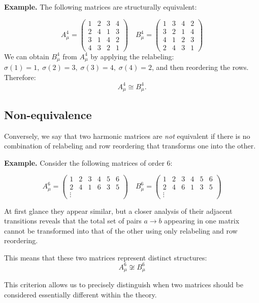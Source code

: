 \documentclass{article}
\begin{document}
\noindent\textbf{Example.}  
The following matrices are structurally equivalent:


\[
A_\mu^4 =
\begin{pmatrix}
1 & 2 & 3 & 4\\
2 & 4 & 1 & 3\\
3 & 1 & 4 & 2\\
4 & 3 & 2 & 1
\end{pmatrix}
\quad
B_\mu^4 =
\begin{pmatrix}
1 & 3 & 4 & 2\\
3 & 2 & 1 & 4\\
4 & 1 & 2 & 3\\
2 & 4 & 3 & 1
\end{pmatrix}
\]
We can obtain \(B_\mu^4\) from \(A_\mu^4\) by applying the relabeling:  
\(\sigma(1) = 1,\; \sigma(2)=3,\; \sigma(3)=4,\; \sigma(4)=2\),  
and then reordering the rows. Therefore:
\[
A_\mu^4 \cong B_\mu^4.
\]

\subsection{Non-equivalence}

Conversely, we say that two harmonic matrices are \emph{not} equivalent if there is no combination of relabeling and row reordering that transforms one into the other.

\medskip
\noindent\textbf{Example.}  
Consider the following matrices of order 6:

\[
A_\mu^6 =
\begin{pmatrix}
1 & 2 & 3 & 4 & 5 & 6\\
2 & 4 & 1 & 6 & 3 & 5\\
\vdots
\end{pmatrix}
\quad
B_\mu^6 =
\begin{pmatrix}
1 & 2 & 3 & 4 & 5 & 6\\
2 & 4 & 6 & 1 & 3 & 5\\
\vdots
\end{pmatrix}
\]

At first glance they appear similar, but a closer analysis of their adjacent transitions reveals that the total set of pairs \(a \to b\) appearing in one matrix cannot be transformed into that of the other using only relabeling and row reordering.

This means that these two matrices represent distinct structures:  
\[
A_\mu^6 \not\cong B_\mu^6
\]

This criterion allows us to precisely distinguish when two matrices should be considered essentially different within the theory.
\end{document}
